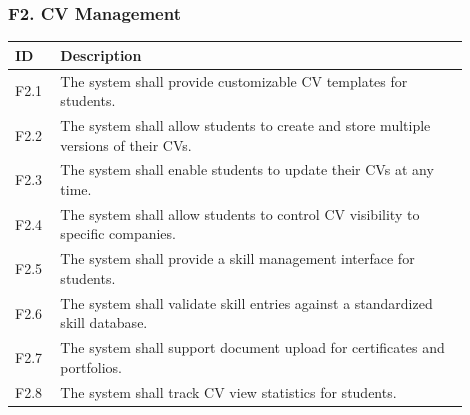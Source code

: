 \subsubsection{F2. CV Management}
\begin{center}
    \begin{longtable}{ |l|p{0.9\linewidth}| }
        \hline
        \textbf{ID} & \textbf{Description} \\
        \hline
        F2.1 & The system shall provide customizable CV templates for students. \\
        \hline
        F2.2 & The system shall allow students to create and store multiple versions of their CVs. \\
        \hline
        F2.3 & The system shall enable students to update their CVs at any time. \\
        \hline
        F2.4 & The system shall allow students to control CV visibility to specific companies. \\
        \hline
        F2.5 & The system shall provide a skill management interface for students. \\
        \hline
        F2.6 & The system shall validate skill entries against a standardized skill database. \\
        \hline
        F2.7 & The system shall support document upload for certificates and portfolios. \\
        \hline
        F2.8 & The system shall track CV view statistics for students. \\
        \hline
    \end{longtable}
\end{center}

